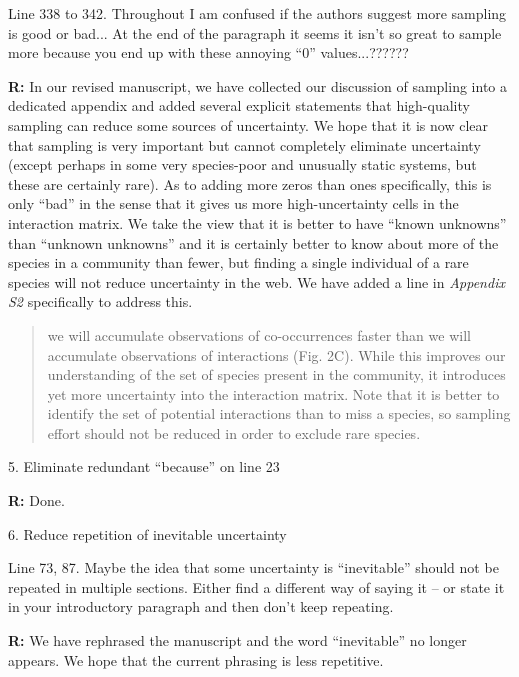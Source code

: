 \documentclass[12pt]{letter}
\newenvironment{refquote}{\bigskip \begin{it}}{\end{it}\smallskip}
\begin{document}
		\begin{refquote}
		Line 338 to 342.  Throughout I am confused if the authors suggest more sampling is good or bad...  At the end of the paragraph it seems it isn't so great to sample more because you end up with these annoying ``0'' values...??????
		\end{refquote}


		\textbf{R:} In our revised manuscript, we have collected our discussion of sampling into a dedicated appendix and added several explicit statements that high-quality sampling can reduce some sources of uncertainty. We hope that it is now clear that sampling is very important but cannot completely eliminate uncertainty (except perhaps in some very species-poor and unusually static systems, but these are certainly rare). As to adding more zeros than ones specifically, this is only ``bad'' in the sense that it gives us more high-uncertainty cells in the interaction matrix. We take the view that it is better to have ``known unknowns'' than ``unknown unknowns'' and it is certainly better to know about more of the species in a community than fewer, but finding a single individual of a rare species will not reduce uncertainty in the web. We have added a line in \emph{Appendix S2} specifically to address this.


		\begin{quotation}
			we will accumulate observations of co-occurrences faster than we will accumulate observations of interactions (Fig. 2C). While this improves our understanding of the set of species present in the community, it introduces yet more uncertainty into the interaction matrix. Note that it is better to identify the set of potential interactions than to miss a species, so sampling effort should not be reduced in order to exclude rare species.
		\end{quotation}


	5. Eliminate redundant ``because'' on line 23 


		\textbf{R:} Done.


	6. Reduce repetition of inevitable uncertainty 


		\begin{refquote}
		Line 73, 87.  Maybe the idea that some uncertainty is ``inevitable'' should not be repeated in multiple sections.  Either find a different way of saying it – or state it in your introductory paragraph and then don't keep repeating.
		\end{refquote}


		\textbf{R:} We have rephrased the manuscript and the word ``inevitable'' no longer appears. We hope that the current phrasing is less repetitive.
\end{document}
